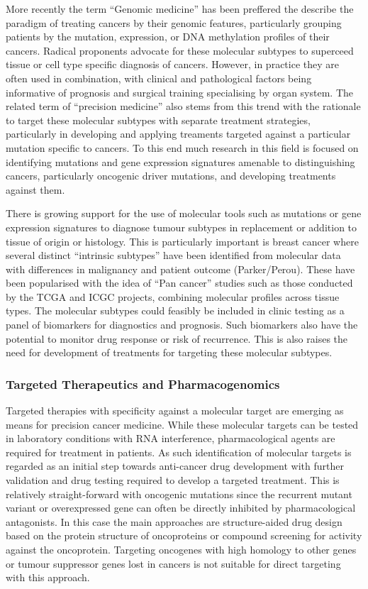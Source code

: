 More recently the term ``Genomic medicine'' has been preffered the describe the paradigm of treating cancers by their genomic features, particularly grouping patients by the mutation, expression, or DNA methylation profiles of their cancers. Radical proponents advocate for these molecular subtypes to superceed tissue or cell type specific diagnosis of cancers. However, in practice they are often used in combination, with clinical and pathological factors being informative of prognosis and surgical training specialising by organ system. The related term of ``precision medicine'' also stems from this trend with the rationale to target these molecular subtypes with separate treatment strategies, particularly in developing and applying treaments targeted against a particular mutation specific to cancers. To this end much research in this field is focused on identifying mutations and gene expression signatures amenable to distinguishing cancers, particularly oncogenic driver mutations, and developing treatments against them.

There is growing support for the use of molecular tools such as mutations or gene expression signatures to diagnose tumour subtypes in replacement or addition to tissue of origin or histology. This is particularly important is breast cancer where several distinct ``intrinsic subtypes'' have been identified from molecular data with differences in malignancy and patient outcome (Parker/Perou). These have been popularised with the idea of ``Pan cancer'' studies such as those conducted by the TCGA and ICGC projects, combining molecular profiles across tissue types. The molecular subtypes could feasibly be included in clinic testing as a panel of biomarkers for diagnostics and prognosis. Such biomarkers also have the potential to monitor drug response or risk of recurrence. This is also raises the need for development of treatments for targeting these molecular subtypes.  

\subsubsection{Targeted Therapeutics and Pharmacogenomics}
Targeted therapies with specificity against a molecular target are emerging as means for precision cancer medicine. While these molecular targets can be tested in laboratory conditions with RNA interference, pharmacological agents are required for treatment in patients. As such identification of molecular targets is regarded as an initial step towards anti-cancer drug development with further validation and drug testing required to develop a targeted treatment. This is relatively straight-forward with oncogenic mutations since the recurrent mutant variant or overexpressed gene can often be directly inhibited by pharmacological antagonists. In this case the main approaches are structure-aided drug design based on the protein structure of oncoproteins or compound screening for activity against the oncoprotein. Targeting oncogenes with high homology to other genes or tumour suppressor genes lost in cancers is not suitable for direct targeting with this approach.

